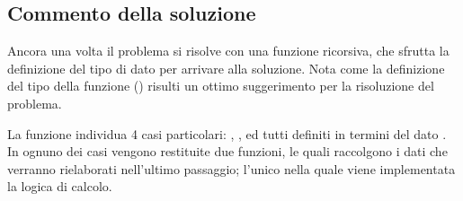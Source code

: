 \subsection{Commento della soluzione}

Ancora una volta il problema si risolve con una funzione ricorsiva, che sfrutta la definizione del tipo di dato  per arrivare alla soluzione. %
Nota come la definizione del tipo della funzione () risulti un ottimo suggerimento per la risoluzione del problema.

La funzione individua 4 casi particolari: , ,  ed  tutti definiti in termini del dato . %
In ognuno dei casi vengono restituite due funzioni, le quali raccolgono i dati che verranno rielaborati nell'ultimo passaggio; %
l'unico nella quale viene implementata la logica di calcolo.
